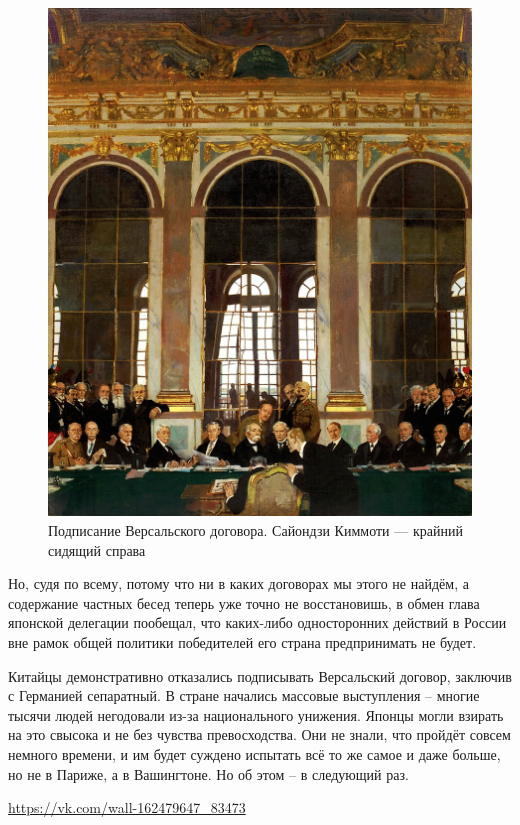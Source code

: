 \begin{figure}[h!tb] 
	\centering\includegraphics[scale=0.2]{Glava5/1FCWB_wh8ZY.jpg}
	\caption{Подписание Версальского договора. Сайондзи Киммоти — крайний сидящий справа}%
\end{figure}

Но, судя по всему, потому что ни в каких договорах мы этого не найдём, а содержание частных бесед теперь уже точно не восстановишь, в обмен глава японской делегации пообещал, что каких-либо односторонних действий в России вне рамок общей политики победителей его страна предпринимать не будет.

Китайцы демонстративно отказались подписывать Версальский договор, заключив с Германией сепаратный. В стране начались массовые выступления – многие тысячи людей негодовали из-за национального унижения. Японцы могли взирать на это свысока и не без чувства превосходства. Они не знали, что пройдёт совсем немного времени, и им будет суждено испытать всё то же самое и даже больше, но не в Париже, а в Вашингтоне. Но об этом – в следующий раз.

\url{https://vk.com/wall-162479647_83473}